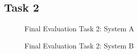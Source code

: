 \subsection*{Task 2}
\begin{figure}[!h]
  \centering
  \begin{minipage}[b]{0.47\textwidth}
    \caption{Final Evaluation Task 2: System A}
    \label{fig:task2A}
  \end{minipage}
  \hfill
  \begin{minipage}[b]{0.47\textwidth}
  \caption{Final Evaluation Task 2: System B}
  \label{fig:task2B}
  \end{minipage}
\end{figure}

\newpage
